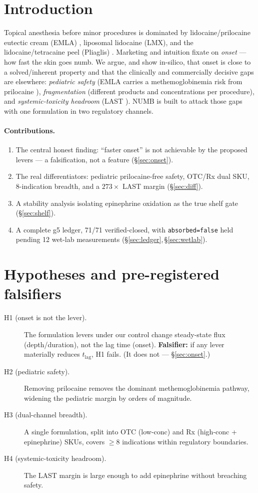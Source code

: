 \documentclass[11pt,a4paper]{article}
\begin{document}
\section{Introduction}
\label{sec:intro}
Topical anesthesia before minor procedures is dominated by lidocaine/prilocaine
eutectic cream (EMLA) \citep{emla}, liposomal lidocaine (LMX), and the
lidocaine/tetracaine peel (Pliaglis) \citep{pliaglis}. Marketing and intuition
fixate on \emph{onset} --- how fast the skin goes numb. We argue, and show
in-silico, that onset is close to a solved/inherent property and that the
clinically and commercially decisive gaps are elsewhere: \emph{pediatric
safety} (EMLA carries a methemoglobinemia risk from prilocaine
\citep{methb}), \emph{fragmentation} (different products and concentrations per
procedure), and \emph{systemic-toxicity headroom} (LAST \citep{weinberg}). NUMB
is built to attack those gaps with one formulation in two regulatory channels.

\paragraph{Contributions.}
\begin{enumerate}
\item The central honest finding: ``faster onset'' is not achievable by the
proposed levers --- a falsification, not a feature (\S\ref{sec:onset}).
\item The real differentiators: pediatric prilocaine-free safety, OTC/Rx dual
SKU, 8-indication breadth, and a $273\times$ LAST margin (\S\ref{sec:diff}).
\item A stability analysis isolating epinephrine oxidation as the true shelf
gate (\S\ref{sec:shelf}).
\item A complete g5 ledger, 71/71 verified-closed, with \texttt{absorbed=false}
held pending 12 wet-lab measurements (\S\ref{sec:ledger},\,\S\ref{sec:wetlab}).
\end{enumerate}

\section{Hypotheses and pre-registered falsifiers}
\label{sec:hypotheses}
\begin{description}
\item[H1 (onset is not the lever).] The formulation levers under our control
change steady-state flux (depth/duration), not the lag time (onset).
\textbf{Falsifier:} if any lever materially reduces $t_{\mathrm{lag}}$, H1 fails.
(It does not --- \S\ref{sec:onset}.)
\item[H2 (pediatric safety).] Removing prilocaine removes the dominant
methemoglobinemia pathway, widening the pediatric margin by orders of magnitude.
\item[H3 (dual-channel breadth).] A single formulation, split into OTC
(low-conc) and Rx (high-conc + epinephrine) SKUs, covers $\ge 8$ indications
within regulatory boundaries.
\item[H4 (systemic-toxicity headroom).] The LAST margin is large enough to add
epinephrine without breaching safety.
\end{description}
\end{document}
